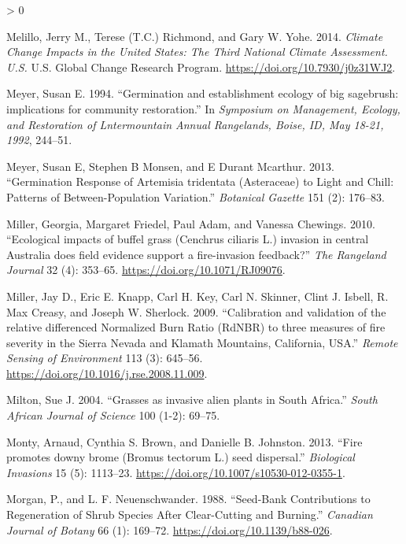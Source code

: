 \documentclass[
  12pt,
]{article}
\newlength{\cslhangindent}
\newenvironment{CSLReferences}[2] %
 {%
  \setlength{\parindent}{0pt}
  \ifodd #1 \everypar{\setlength{\hangindent}{\cslhangindent}}\ignorespaces\fi
  \ifnum #2 > 0
  \setlength{\parskip}{#2\baselineskip}
  \fi
 }%
 {}
\begin{document}
\begin{CSLReferences}{1}{0}
\leavevmode\hypertarget{ref-Melillo2014}{}%
Melillo, Jerry M., Terese (T.C.) Richmond, and Gary W. Yohe. 2014.
\emph{Climate {Change} {Impacts} in the {United} {States}: {The} {Third}
{National} {Climate} {Assessment}. {U}.{S}.} U.S. Global Change Research
Program. \url{https://doi.org/10.7930/j0z31WJ2}.

\leavevmode\hypertarget{ref-Meyer1994}{}%
Meyer, Susan E. 1994. {``{Germination and establishment ecology of big
sagebrush: implications for community restoration}.''} In
\emph{Symposium on Management, Ecology, and Restoration of Lntermountain
Annual Rangelands, Boise, ID, May 18-21, 1992}, 244--51.

\leavevmode\hypertarget{ref-Meyer2013}{}%
Meyer, Susan E, Stephen B Monsen, and E Durant Mcarthur. 2013.
{``{Germination Response of Artemisia tridentata (Asteraceae) to Light
and Chill: Patterns of Between-Population Variation}.''} \emph{Botanical
Gazette} 151 (2): 176--83.

\leavevmode\hypertarget{ref-Miller2010}{}%
Miller, Georgia, Margaret Friedel, Paul Adam, and Vanessa Chewings.
2010. {``{Ecological impacts of buffel grass (Cenchrus ciliaris L.)
invasion in central Australia does field evidence support a
fire-invasion feedback?}''} \emph{The Rangeland Journal} 32 (4):
353--65. \url{https://doi.org/10.1071/RJ09076}.

\leavevmode\hypertarget{ref-Miller2009}{}%
Miller, Jay D., Eric E. Knapp, Carl H. Key, Carl N. Skinner, Clint J.
Isbell, R. Max Creasy, and Joseph W. Sherlock. 2009. {``{Calibration and
validation of the relative differenced Normalized Burn Ratio (RdNBR) to
three measures of fire severity in the Sierra Nevada and Klamath
Mountains, California, USA}.''} \emph{Remote Sensing of Environment} 113
(3): 645--56. \url{https://doi.org/10.1016/j.rse.2008.11.009}.

\leavevmode\hypertarget{ref-Milton2004}{}%
Milton, Sue J. 2004. {``{Grasses as invasive alien plants in South
Africa}.''} \emph{South African Journal of Science} 100 (1-2): 69--75.

\leavevmode\hypertarget{ref-Monty2013}{}%
Monty, Arnaud, Cynthia S. Brown, and Danielle B. Johnston. 2013.
{``{Fire promotes downy brome (Bromus tectorum L.) seed dispersal}.''}
\emph{Biological Invasions} 15 (5): 1113--23.
\url{https://doi.org/10.1007/s10530-012-0355-1}.

\leavevmode\hypertarget{ref-Morgan1988}{}%
Morgan, P., and L. F. Neuenschwander. 1988. {``Seed-Bank Contributions
to Regeneration of Shrub Species After Clear-Cutting and Burning.''}
\emph{Canadian Journal of Botany} 66 (1): 169--72.
\url{https://doi.org/10.1139/b88-026}.


\end{CSLReferences}
\end{document}
